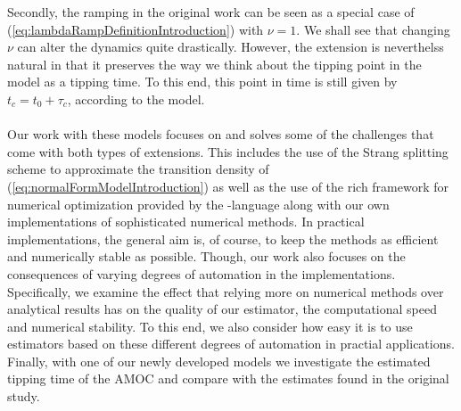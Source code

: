 Secondly, the ramping in the original work \cite[equation (2)]{Ditlevsen2023} can be seen as a special case of (\ref{eq:lambdaRampDefinitionIntroduction}) with $\nu = 1$. We shall see that changing $\nu$ can alter the dynamics quite drastically. However, the extension is neverthelss natural in that it preserves the way we think about the tipping point in the model as a tipping time. To this end, this point in time is still given by $t_c = t_0 + \tau_c$, according to the model.\\\\
Our work with these models focuses on and solves some of the challenges that come with both types of extensions. This includes the use of the Strang splitting scheme\cite{SplittingSchemes} to approximate the transition density of (\ref{eq:normalFormModelIntroduction}) as well as the use of the rich framework for numerical optimization provided by the -language along with our own implementations of sophisticated numerical methods. \cite{Rlang} In practical implementations, the general aim is, of course, to keep the methods as efficient and numerically stable as possible. Though, our work also focuses on the consequences of varying degrees of automation in the implementations. Specifically, we examine the effect that relying more on numerical methods over analytical results has on the quality of our estimator, the computational speed and numerical stability. To this end, we also consider how easy it is to use estimators based on these different degrees of automation in practial applications. Finally, with one of our newly developed models we investigate the estimated tipping time of the AMOC and compare with the estimates found in the original study.
